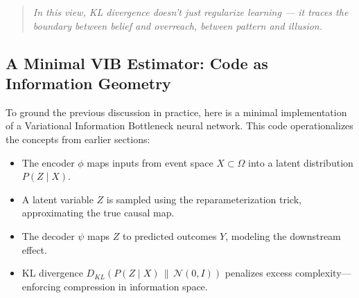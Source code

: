 \begin{quote}
\textit{In this view, KL divergence doesn’t just regularize learning — it traces the boundary between belief and overreach, between pattern and illusion.}
\end{quote}







\subsection{A Minimal VIB Estimator: Code as Information Geometry}

To ground the previous discussion in practice, here is a minimal implementation of a Variational Information Bottleneck neural network. This code operationalizes the concepts from earlier sections:

\begin{itemize}
    \item The encoder \( \phi \) maps inputs from event space \( X \subset \Omega \) into a latent distribution \( P(Z \mid X) \).
    \item A latent variable \( Z \) is sampled using the reparameterization trick, approximating the true causal map.
    \item The decoder \( \psi \) maps \( Z \) to predicted outcomes \( Y \), modeling the downstream effect.
    \item KL divergence \( D_{KL}(P(Z \mid X) \,\|\, \mathcal{N}(0, I)) \) penalizes excess complexity—enforcing compression in information space.
\end{itemize}


